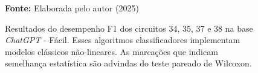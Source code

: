 \begin{figure}
\caption{Resultados do desempenho F1 dos circuitos 34, 35, 37 e 38 na base \textit{ChatGPT} - Fácil. Esses algoritmos classificadores implementam modelos clássicos não-lineares. As marcações que indicam semelhança estatística são advindas do teste pareado de Wilcoxon.}
\label{fig:f1:easy:g5}
     \centering
    \centering

      \par\medskip\ABNTEXfontereduzida\selectfont\textbf{Fonte:} Elaborada pelo autor (2025) \par\medskip
\end{figure}